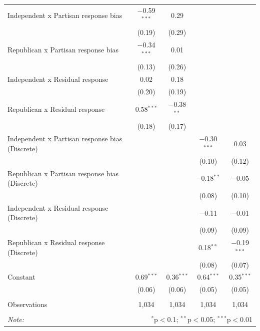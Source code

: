 \documentclass{article}\usepackage[]{graphicx}\usepackage[]{xcolor}
\begin{document}
\begin{table}[H]
\begin{tabular}{@{\extracolsep{5pt}}lcccc}
  Independent x Partisan response bias & $-$0.59$^{***}$ & 0.29 &  &  \\ 
  & (0.19) & (0.29) &  &  \\ 
  Republican x Partisan response bias & $-$0.34$^{***}$ & 0.01 &  &  \\ 
  & (0.13) & (0.26) &  &  \\ 
  Independent x Residual response & 0.02 & 0.18 &  &  \\ 
  & (0.20) & (0.19) &  &  \\ 
  Republican x Residual response & 0.58$^{***}$ & $-$0.38$^{**}$ &  &  \\ 
  & (0.18) & (0.17) &  &  \\ 
  Independent x Partisan response bias (Discrete) &  &  & $-$0.30$^{***}$ & 0.03 \\ 
  &  &  & (0.10) & (0.12) \\ 
  Republican x Partisan response bias (Discrete) &  &  & $-$0.18$^{**}$ & $-$0.05 \\ 
  &  &  & (0.08) & (0.10) \\ 
  Independent x Residual response (Discrete) &  &  & $-$0.11 & $-$0.01 \\ 
  &  &  & (0.09) & (0.09) \\ 
  Republican x Residual response (Discrete) &  &  & 0.18$^{**}$ & $-$0.19$^{***}$ \\ 
  &  &  & (0.08) & (0.07) \\ 
  Constant & 0.69$^{***}$ & 0.36$^{***}$ & 0.64$^{***}$ & 0.35$^{***}$ \\ 
  & (0.06) & (0.06) & (0.05) & (0.05) \\ 
 \hline \\[-1.8ex] 
Observations & 1,034 & 1,034 & 1,034 & 1,034 \\ 
\hline 
\hline \\[-1.8ex] 
\textit{Note:}  & \multicolumn{4}{r}{$^{*}$p$<$0.1; $^{**}$p$<$0.05; $^{***}$p$<$0.01} \\ 
\end{tabular} 

\end{table}
\end{document}
